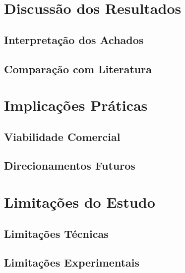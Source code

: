 
\section{Discussão dos Resultados}


\subsection{Interpretação dos Achados}


\subsection{Comparação com Literatura}


\section{Implicações Práticas}


\subsection{Viabilidade Comercial}


\subsection{Direcionamentos Futuros}


\section{Limitações do Estudo}


\subsection{Limitações Técnicas}


\subsection{Limitações Experimentais}

